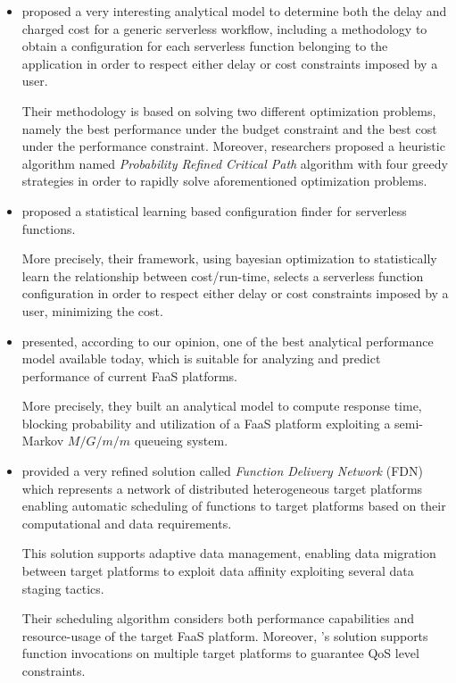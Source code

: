 \documentclass[12pt,a4paper]{report}
\begin{document}
\begin{itemize}
	\item \citet{PMSCP} proposed a very interesting analytical model to determine both the delay and charged cost for a generic serverless workflow, including a methodology to obtain a configuration for each serverless function belonging to the application in order to respect either delay or cost constraints imposed by a user.
	
	Their methodology is based on solving two different optimization problems, namely the best performance under the budget constraint and the best cost under the performance constraint. Moreover, researchers proposed a heuristic algorithm named \textit{Probability Refined Critical Path} algorithm with four greedy
	strategies in order to rapidly solve aforementioned optimization problems. 
	
	\item \citet{COSE} proposed a statistical learning based configuration finder for serverless functions. 
	
	More precisely, their framework, using bayesian optimization to statistically learn the relationship between cost/run-time, selects a serverless function configuration in order to respect either delay or cost constraints imposed by a user, minimizing the cost.
	
	\item \citet{Modelling} presented, according to our opinion, one of the best analytical performance model available today, which is suitable for analyzing and predict performance of current FaaS platforms. 
	
	More precisely, they built an analytical model to compute response time, blocking probability and utilization of a FaaS platform exploiting a semi-Markov $M/G/m/m$ queueing system.

	\item \citet{NUOVODOCUMENTO} provided a very refined solution called \textit{Function Delivery Network} (FDN) which represents a network of distributed heterogeneous target platforms enabling automatic scheduling of functions to target platforms based on their computational and data requirements. 
	
	This solution supports adaptive data management, enabling data migration between target platforms to exploit data affinity exploiting several data staging tactics.
	
	Their scheduling algorithm considers both performance capabilities and resource-usage of the target FaaS platform. Moreover, \citet{NUOVODOCUMENTO}'s solution supports function invocations on multiple target platforms to guarantee QoS level constraints.
	

\end{itemize}
\end{document}

